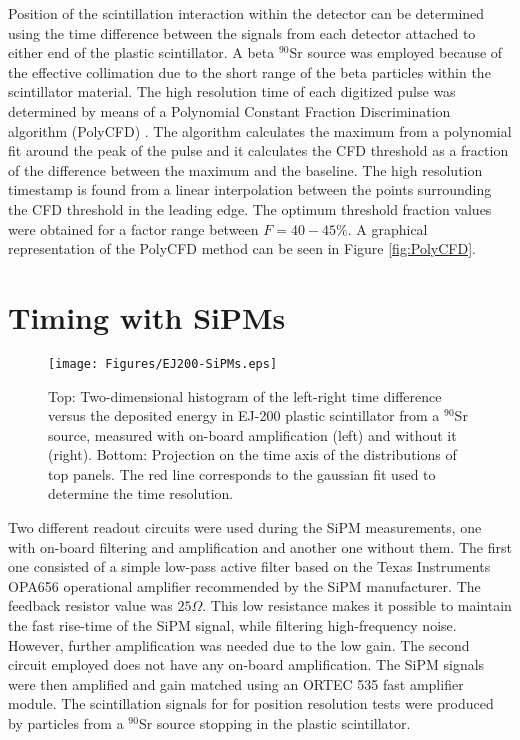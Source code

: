 Position of the scintillation interaction within the detector can be determined using the time difference between the signals from each detector attached to either end of the plastic scintillator. A beta $^{90}$Sr source was employed because of the effective collimation due to the short range of the beta particles within the scintillator material. The high resolution time of each digitized pulse was determined by means of a Polynomial Constant Fraction Discrimination  algorithm (PolyCFD) \cite{PhDCory}. The algorithm calculates the maximum from a polynomial fit around the peak of the pulse and it calculates the CFD threshold as a fraction of the difference between the maximum and the baseline. The high resolution timestamp is found from a linear interpolation between the points surrounding the CFD threshold in the leading edge. The optimum threshold fraction values were obtained for a factor range between $F=40-45\%$. A graphical representation of the PolyCFD method can be seen in Figure \ref{fig:PolyCFD}.

\section{Timing with SiPMs} \label{sec:timingWithSiPMs}
\begin{figure}[hbt]
\centering
\texttt{[image: Figures/EJ200-SiPMs.eps]}
\caption{Top: Two-dimensional histogram of the left-right time difference versus the deposited energy in EJ-200 plastic scintillator from a $^{90}$Sr source, measured with on-board amplification (left) and without it (right). Bottom: Projection on the time axis of the  distributions of top panels. The red line corresponds to the gaussian fit used to determine the time resolution.}
\label{fig:SiPMtiming}
\end{figure}

Two different readout circuits were used during the SiPM measurements, one with on-board  filtering and amplification and another one without them. The first one consisted of a simple low-pass active filter based on the Texas Instruments\textsuperscript{\textregistered} OPA656 operational amplifier recommended by the SiPM manufacturer. The feedback resistor value was $25\Omega$. This low resistance makes it possible to maintain the fast rise-time of the SiPM signal, while filtering high-frequency noise. However, further amplification was needed due to the low gain.  The second circuit employed does not have any on-board amplification. The SiPM signals were then amplified and gain matched using an ORTEC\textsuperscript{\textregistered} 535 fast amplifier module. The scintillation signals for for position resolution tests were produced by particles from a $^{90}$Sr source stopping in the plastic scintillator.

